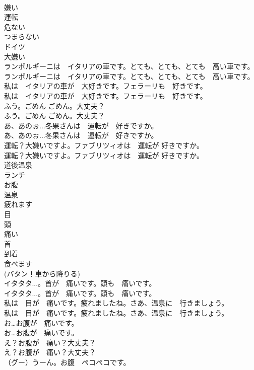 \documentclass[8pt]{extreport}
\begin{document}
\begin{CJK}{UTF8}{min}
\\	嫌い
\\	運転
\\	危ない
\\	つまらない
\\	ドイツ
\\	大嫌い
\\	ランボルギーニは　イタリアの車です。とても、とても、とても　高い車です。	
\\	ランボルギーニは　イタリアの車です。とても、とても、とても　高い車です。 
\\	私は　イタリアの車が　大好きです。フェラーリも　好きです。	
\\	私は　イタリアの車が　大好きです。フェラーリも　好きです。 
\\	ふう。ごめん ごめん。大丈夫？	
\\	ふう。ごめん ごめん。大丈夫？ 
\\	あ、あのぉ...冬果さんは　運転が　好きですか。	
\\	あ、あのぉ...冬果さんは　運転が　好きですか。 
\\	運転？大嫌いですよ。ファブリツィオは　運転が 好きですか。	
\\	運転？大嫌いですよ。ファブリツィオは　運転が 好きですか。 
\\	道後温泉
\\	ランチ
\\	お腹
\\	温泉
\\	疲れます
\\	目
\\	頭
\\	痛い
\\	首
\\	到着
\\	食べます
\\	(バタン！車から降りる)	
\\	イタタタ...。首が　痛いです。頭も　痛いです。	
\\	イタタタ...。首が　痛いです。頭も　痛いです。 
\\	私は　目が　痛いです。疲れましたね。さあ、温泉に　行きましょう。	
\\	私は　目が　痛いです。疲れましたね。さあ、温泉に　行きましょう。 
\\	お…お腹が　痛いです。	
\\	お…お腹が　痛いです。 
\\	え？お腹が　痛い？大丈夫？	
\\	え？お腹が　痛い？大丈夫？ 
\\	（グー）うーん。お腹　ペコペコです。	

\end{CJK}
\end{document}
